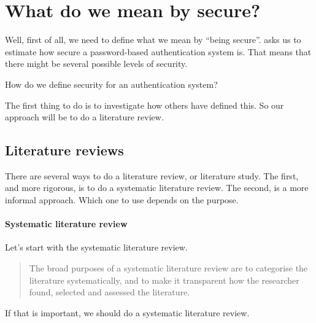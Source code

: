 \section{What do we mean by secure?}

Well, first of all, we need to define what we mean by \enquote{being secure}.
 asks us to estimate how secure a password-based authentication system 
is.
That means that there might be several possible levels of security.

\begin{frame}[fragile]
  \begin{exercise}
    How do we define security for an authentication system?
  \end{exercise}
\end{frame}

\begin{frame}
  \begin{solution}
    The first thing to do is to investigate how others have defined this.
    So our approach will be to do a literature review.
  \end{solution}
\end{frame}

\subsection{Literature reviews}

There are several ways to do a literature review, or literature study.
The first, and more rigorous, is to do a systematic literature review.
The second, is a more informal approach.
Which one to use depends on the purpose.

\paragraph{Systematic literature review}

Let's start with the systematic literature review.
\blockcquote{ANUSLR}{%
The broad purposes of a systematic literature review are to categorise the 
literature systematically, and to make it transparent how the researcher found, 
selected and assessed the literature.%
}
If that is important, we should do a systematic literature review.


